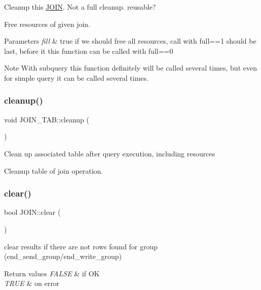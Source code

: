 Cleanup this \mbox{\hyperlink{classJOIN}{J\+O\+IN}}. Not a full cleanup. reusable?

Free resources of given join.


\begin{DoxyParams}{Parameters}
{\em fill} & true if we should free all resources, call with full==1 should be last, before it this function can be called with full==0\\
\hline
\end{DoxyParams}
\begin{DoxyNote}{Note}
With subquery this function definitely will be called several times, but even for simple query it can be called several times. 
\end{DoxyNote}
\mbox{\label{group__Query__Optimizer_gae913870950feb0d927de9b53963f0a6a}} 
\subsubsection{\texorpdfstring{cleanup()}{cleanup()}\hspace{0.1cm}{\footnotesize\ttfamily [2/2]}}
{\footnotesize\ttfamily void J\+O\+I\+N\+\_\+\+T\+A\+B\+::cleanup (\begin{DoxyParamCaption}{ }\end{DoxyParamCaption})}

Clean up associated table after query execution, including resources

Cleanup table of join operation. \mbox{\label{group__Query__Optimizer_gacff1c1a49375e2f52301214084924bf3}} 
\subsubsection{\texorpdfstring{clear()}{clear()}}
{\footnotesize\ttfamily bool J\+O\+I\+N\+::clear (\begin{DoxyParamCaption}{ }\end{DoxyParamCaption})}

clear results if there are not rows found for group (end\+\_\+send\+\_\+group/end\+\_\+write\+\_\+group) 
\begin{DoxyRetVals}{Return values}
{\em F\+A\+L\+SE} & if OK \\
\hline
{\em T\+R\+UE} & on error ~\newline
 \\
\hline
\end{DoxyRetVals}
\mbox{\label{group__Query__Optimizer_ga8478e8df214dcc332c84d24ebe3f0785}} 
